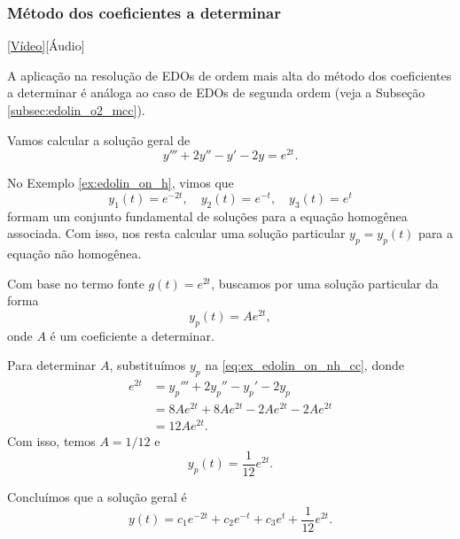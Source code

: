 \subsubsection{Método dos coeficientes a determinar}

\begin{flushright}
  \href{https://archive.org/details/edo-ordem-n-mcd}{[Vídeo]}[Áudio]
\end{flushright}

A aplicação na resolução de EDOs de ordem mais alta do método dos coeficientes a determinar é análoga ao caso de EDOs de segunda ordem (veja a Subseção \ref{subsec:edolin_o2_mcc}).

\begin{ex}
  Vamos calcular a solução geral de
  \begin{equation}\label{eq:ex_edolin_on_nh_cc}
    y''' + 2y'' - y' - 2y = e^{2t}.
  \end{equation}

  No Exemplo \ref{ex:edolin_on_h}, vimos que
  \begin{equation}
    y_1(t) = e^{-2t},\quad y_2(t)=e^{-t},\quad y_3(t)=e^t
  \end{equation}
  formam um conjunto fundamental de soluções para a equação homogênea associada. Com isso, nos resta calcular uma solução particular $y_p=y_p(t)$ para a equação não homogênea.

  Com base no termo fonte $g(t) = e^{2t}$, buscamos por uma solução particular da forma
  \begin{equation}
    y_p(t) = Ae^{2t},
  \end{equation}
  onde $A$ é um coeficiente a determinar.

  Para determinar $A$, substituímos $y_p$ na \eqref{eq:ex_edolin_on_nh_cc}, donde
  \begin{align}
    e^{2t} &= y_p''' + 2y_p'' - y_p' - 2y_p \\
           &= 8Ae^{2t}+8Ae^{2t}-2Ae^{2t}-2Ae^{2t} \\
           &= 12Ae^{2t}.
  \end{align}
  Com isso, temos $A = 1/12$ e
  \begin{equation}
    y_p(t) = \frac{1}{12}e^{2t}.
  \end{equation}

  Concluímos que a solução geral é
  \begin{equation}
    y(t) = c_1e^{-2t} + c_2e^{-t} + c_3e^t + \frac{1}{12}e^{2t}.
  \end{equation}
\end{ex}


